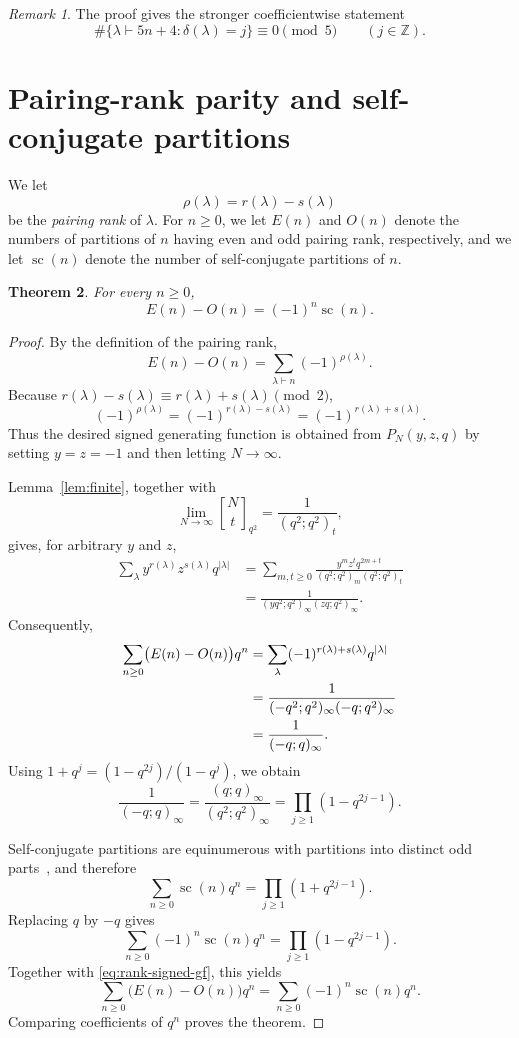 \documentclass[11pt]{article}
\newtheorem{theorem}{Theorem}[section]
\theoremstyle{definition}
\theoremstyle{remark}
\newtheorem{remark}[theorem]{Remark}
\newcommand{\qbinom}[3][]{%
  \genfrac{[}{]}{0pt}{}{#2}{#3}_{#1}%
}
\begin{document}
\begin{remark}
The proof gives the stronger coefficientwise statement
\[
 \#\{\lambda\vdash5n+4:\delta(\lambda)=j\}\equiv0\pmod5
 \qquad(j\in\mathbb Z).
\]
\end{remark}



\section{Pairing-rank parity and self-conjugate partitions}

We let
\[
 \rho(\lambda)=r(\lambda)-s(\lambda)
\]
be the \emph{pairing rank} of $\lambda$.  For $n\geq0$, we let $E(n)$ and $O(n)$ denote the numbers of partitions of $n$ having even and odd pairing rank, respectively, and we let $\operatorname{sc}(n)$ denote the number of self-conjugate partitions of $n$.

\begin{theorem}\label{thm:rank-parity}
For every $n\geq0$,
\[
 E(n)-O(n)=(-1)^n\operatorname{sc}(n).
\]
\end{theorem}

\begin{proof}
By the definition of the pairing rank,
\[
 E(n)-O(n)=\sum_{\lambda\vdash n}(-1)^{\rho(\lambda)}.
\]
Because $r(\lambda)-s(\lambda)\equiv r(\lambda)+s(\lambda)\pmod2$,
\[
 (-1)^{\rho(\lambda)}
 =(-1)^{r(\lambda)-s(\lambda)}
 =(-1)^{r(\lambda)+s(\lambda)}.
\]
Thus the desired signed generating function is obtained from $P_N(y,z,q)$ by setting $y=z=-1$ and then letting $N\to\infty$.

Lemma~\ref{lem:finite}, together with
\[
 \lim_{N\to\infty}\qbinom[q^2]{N}{t}
 =\frac{1}{(q^2;q^2)_t},
\]
gives, for arbitrary $y$ and $z$,
\begin{align*}
 \sum_{\lambda}y^{r(\lambda)}z^{s(\lambda)}q^{|\lambda|}
 &=\sum_{m,t\geq0}
 \frac{y^mz^tq^{2m+t}}
 {(q^2;q^2)_m(q^2;q^2)_t}\\
 &=\frac{1}{(yq^2;q^2)_\infty(zq;q^2)_\infty}.
\end{align*}
Consequently,
\begin{align}
 \sum_{n\geq0}\bigl(E(n)-O(n)\bigr)q^n
 &=\sum_{\lambda}(-1)^{r(\lambda)+s(\lambda)}q^{|\lambda|}\notag\\
 &=\frac{1}{(-q^2;q^2)_\infty(-q;q^2)_\infty}\notag\\
 &=\frac{1}{(-q;q)_\infty}.\label{eq:rank-signed-gf}
\end{align}
Using $1+q^j=(1-q^{2j})/(1-q^j)$, we obtain
\[
 \frac{1}{(-q;q)_\infty}
 =\frac{(q;q)_\infty}{(q^2;q^2)_\infty}
 =\prod_{j\geq1}(1-q^{2j-1}).
\]

Self-conjugate partitions are equinumerous with partitions into distinct odd parts~\cite[Chapter~1]{AndrewsPartitions}, and therefore
\[
 \sum_{n\geq0}\operatorname{sc}(n)q^n
 =\prod_{j\geq1}(1+q^{2j-1}).
\]
Replacing $q$ by $-q$ gives
\[
 \sum_{n\geq0}(-1)^n\operatorname{sc}(n)q^n
 =\prod_{j\geq1}(1-q^{2j-1}).
\]
Together with \eqref{eq:rank-signed-gf}, this yields
\[
 \sum_{n\geq0}\bigl(E(n)-O(n)\bigr)q^n
 =\sum_{n\geq0}(-1)^n\operatorname{sc}(n)q^n.
\]
Comparing coefficients of $q^n$ proves the theorem.
\end{proof}
\end{document}
